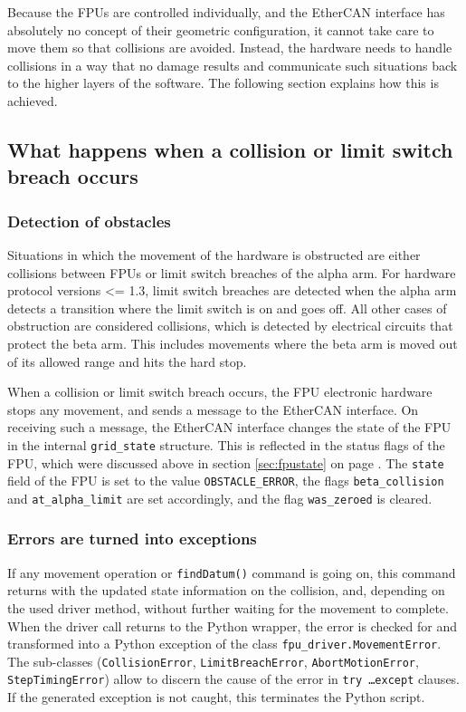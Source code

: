 \documentclass[11pt,a4paper]{scrartcl}
\begin{document}
Because the FPUs are controlled individually, and the  EtherCAN interface
has absolutely no concept of their geometric configuration, it cannot
take care to move them so that collisions are avoided.  Instead, the
hardware needs to handle collisions in a way that no damage results
and communicate such situations back to the higher layers of the
software. The following section explains how this is achieved.

\subsection{What happens when a collision or limit switch breach occurs}
\subsubsection{Detection of obstacles}

Situations in which the movement of the hardware is obstructed are
either collisions between FPUs or limit switch breaches of the alpha
arm. For hardware protocol versions <= 1.3, limit switch breaches are
detected when the alpha arm detects a transition where the limit
switch is on and goes off. All other cases of obstruction are
considered collisions, which is detected by electrical circuits that
protect the beta arm. This includes movements where the beta arm is
moved out of its allowed range and hits the hard stop.

When a collision or limit switch breach occurs, the FPU electronic
hardware stops any movement, and sends a message to the EtherCAN interface. On
receiving such a message, the EtherCAN interface changes the state of the FPU in
the internal \texttt{grid\_state} structure. This is reflected in the
status flags of the FPU, which were discussed above in section
\ref{sec:fpustate} on page \pageref{sec:fpustate}.  The \texttt{state}
field of the FPU is set to the value \texttt{OBSTACLE\_ERROR}, the
flags \texttt{beta\_collision} and \texttt{at\_alpha\_limit} are set
accordingly, and the flag \texttt{was\_zeroed} is cleared.


\subsubsection{Errors are turned into exceptions}

\begin{sloppypar}
If any movement operation or \texttt{findDatum()} command is going on,
this command returns with the updated state information on the
collision, and, depending on the used driver method, without further
waiting for the movement to complete.  When the driver call returns to
the Python wrapper, the error is checked for and transformed into a
Python exception of the class \texttt{fpu\_driver.MovementError}. The
sub-classes (\texttt{CollisionError}, \texttt{LimitBreachError},
\texttt{AbortMotionError}, \texttt{StepTimingError}) allow to discern
the cause of the error in \texttt{try \ldots except} clauses.  If the
generated exception is not caught, this terminates the Python script.
\end{sloppypar}
\end{document}
